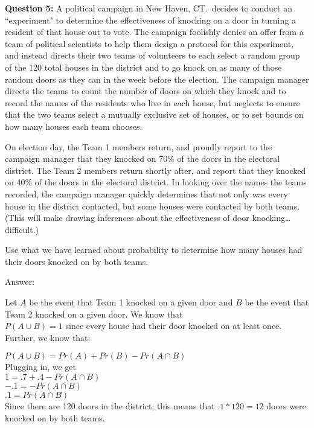 \documentclass[12pt]{article}
\begin{document}
\noindent \textbf{Question 5:} A political campaign in New Haven, CT.\ decides to conduct an ``experiment" to determine the effectiveness of knocking on a door in turning a resident of that house out to vote. The campaign foolishly denies an offer from a team of political scientists to help them design a protocol for this experiment, and instead directs their two teams of volunteers to each select a random group of the 120 total houses in the district and to go knock on as many of those random doors as they can in the week before the election. The campaign manager directs the teams to count the number of doors on which they knock and to record the names of the residents who live in each house, but neglects to ensure that the two teams select a mutually exclusive set of houses, or to set bounds on how many houses each team chooses. 

On election day, the Team 1 members return, and proudly report to the campaign manager that they knocked on 70\% of the doors in the electoral district. The Team 2 members return shortly after, and report that they knocked on 40\% of the doors in the electoral district. In looking over the names the teams recorded, the campaign manager quickly determines that not only was every house in the district contacted, but some houses were contacted by both teams. (This will make drawing inferences about the effectiveness of door knocking\ldots difficult.)

Use what we have learned about probability to determine how many houses had their doors knocked on by both teams.

\bigskip
Answer:

Let $A$ be the event that Team 1 knocked on a given door and $B$ be the event that Team 2 knocked on a given door. We know that\\

$P(A\cup B) = 1$ since every house had their door knocked on at least once. Further, we know that:

$P(A \cup B) = Pr(A) + Pr(B) - Pr(A \cap B)$\\

Plugging in, we get\\

$1 = .7 + .4 - Pr(A \cap B)$\\
$-.1 = - Pr(A \cap B)$\\
$.1 = Pr(A \cap B)$\\

Since there are 120 doors in the district, this means that $.1*120=12$ doors were knocked on by both teams.
\end{document}
